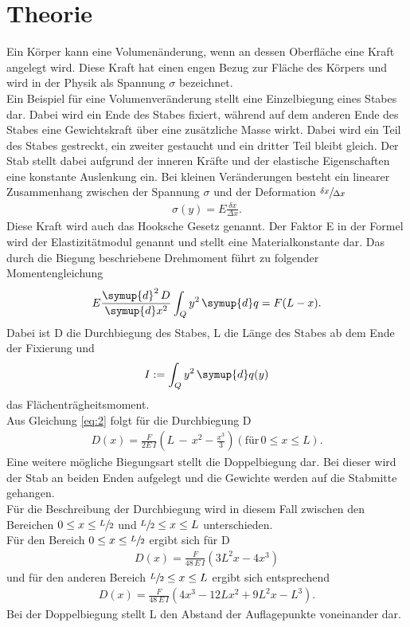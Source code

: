 \section{Theorie}\justifying
Ein Körper kann eine Volumenänderung, wenn an dessen Oberfläche eine Kraft angelegt
wird. Diese Kraft hat einen engen Bezug zur Fläche des Körpers und wird in der Physik
als Spannung $\sigma$ bezeichnet.\\
Ein Beispiel für eine Volumenveränderung stellt eine Einzelbiegung eines Stabes dar.
Dabei wird ein Ende des Stabes fixiert, während auf dem anderen Ende des Stabes eine
Gewichtskraft über eine zusätzliche Masse wirkt. Dabei wird ein Teil des Stabes gestreckt,
ein zweiter gestaucht und ein dritter Teil bleibt gleich. Der Stab stellt dabei aufgrund der inneren
Kräfte und der elastische Eigenschaften eine konstante Auslenkung ein.
Bei kleinen Veränderungen
besteht ein linearer Zusammenhang zwischen der Spannung $\sigma$  und der Deformation $\sfrac{\delta x}{\Delta x} $ \cite{V103}
\begin{align}
    \sigma (y)=E \frac{\delta x}{\Delta x} \label{eq:1}.
\end{align}
Diese Kraft wird auch das Hooksche Gesetz genannt. Der Faktor E in der Formel wird
der Elastizitätmodul genannt und stellt eine Materialkonstante dar.
Das durch die Biegung beschriebene Drehmoment führt zu folgender Momentengleichung \cite{V103}
\begin{align}
    E \frac{\symup{d}^2 \, D}{\symup{d}x^2}\int_Q y^2 \, \symup{d}q = F(L-x) .\label{eq:2}
\end{align}
Dabei ist D die Durchbiegung des Stabes, L die Länge des Stabes ab dem Ende der Fixierung und \cite{V103}
\begin{align}
    I := \int_Q y^2 \, \symup{d}q(y) \label{eq:3}
\end{align}
das Flächenträgheitsmoment. \\
Aus Gleichung \eqref{eq:2} folgt für die Durchbiegung D \cite{V103}
\begin{align}
    D(x)=\frac{F}{2E\,I}\left(L \, - \, x^2-\frac{x^3}{3}\right) \label{eq:4} (\text{für} \, 0\leq x \leq L).
\end{align}
Eine weitere mögliche Biegungsart stellt die Doppelbiegung dar. Bei dieser wird
der Stab an beiden Enden aufgelegt und die Gewichte werden auf die Stabmitte 
gehangen. \\
Für die Beschreibung der Durchbiegung wird in diesem Fall zwischen den Bereichen
$ 0\leq x\leq \sfrac{L}{2} $ und $\sfrac{L}{2} \leq x \leq L $ unterschieden.\\
Für den Bereich $0\leq x\leq \sfrac{L}{2}$ ergibt sich für D \cite{V103}
\begin{align}
    D(x)=\frac{F}{48\, E\, I}(3L^2x-4x^3) \label{eq:5}
\end{align}
und für den anderen Bereich $\sfrac{L}{2} \leq x \leq L $ ergibt sich entsprechend \cite{V103}
\begin{align}
    D(x)=\frac{F}{48\, E\, I}(4x^3 - 12Lx^2 +9L^2x-L^3) \label{eq:6}.
\end{align}
Bei der Doppelbiegung stellt L den Abstand der Auflagepunkte voneinander dar.

